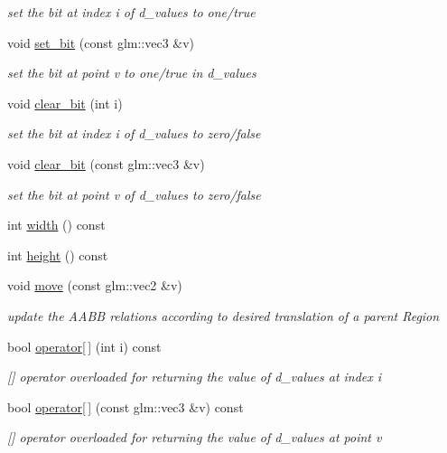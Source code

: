 \begin{DoxyCompactItemize}
\begin{DoxyCompactList}\small\item\em set the bit at index i of d\+\_\+values to one/true \end{DoxyCompactList}\item 
void \mbox{\hyperlink{class_region_mask_a1f4a7ce3ec3c48edbbc064e78159b823}{set\+\_\+bit}} (const glm\+::vec3 \&v)
\begin{DoxyCompactList}\small\item\em set the bit at point v to one/true in d\+\_\+values \end{DoxyCompactList}\item 
void \mbox{\hyperlink{class_region_mask_ac867580822cbae6a64a984be88e6a2b8}{clear\+\_\+bit}} (int i)
\begin{DoxyCompactList}\small\item\em set the bit at index i of d\+\_\+values to zero/false \end{DoxyCompactList}\item 
void \mbox{\hyperlink{class_region_mask_ac561c2fda2080886c1ad98633e2b9851}{clear\+\_\+bit}} (const glm\+::vec3 \&v)
\begin{DoxyCompactList}\small\item\em set the bit at point v of d\+\_\+values to zero/false \end{DoxyCompactList}\item 
int \mbox{\hyperlink{class_region_mask_a2f2d1b44819b5a0ef89c24306786a4ad}{width}} () const
\item 
int \mbox{\hyperlink{class_region_mask_ab6b1a79837b40af8f309f3f725d48891}{height}} () const
\item 
void \mbox{\hyperlink{class_region_mask_ad8ea284da3d4643735b4c652cbb8a3ab}{move}} (const glm\+::vec2 \&v)
\begin{DoxyCompactList}\small\item\em update the A\+A\+BB relations according to desired translation of a parent Region \end{DoxyCompactList}\item 
bool \mbox{\hyperlink{class_region_mask_af1fb7eddccb93181719616e6cbb5f6c9}{operator\mbox{[}$\,$\mbox{]}}} (int i) const
\begin{DoxyCompactList}\small\item\em \mbox{[}\mbox{]} operator overloaded for returning the value of d\+\_\+values at index i \end{DoxyCompactList}\item 
bool \mbox{\hyperlink{class_region_mask_aa0f79b54ae1e65bc25522d87ef6e7597}{operator\mbox{[}$\,$\mbox{]}}} (const glm\+::vec3 \&v) const
\begin{DoxyCompactList}\small\item\em \mbox{[}\mbox{]} operator overloaded for returning the value of d\+\_\+values at point v \end{DoxyCompactList}\end{DoxyCompactItemize}
